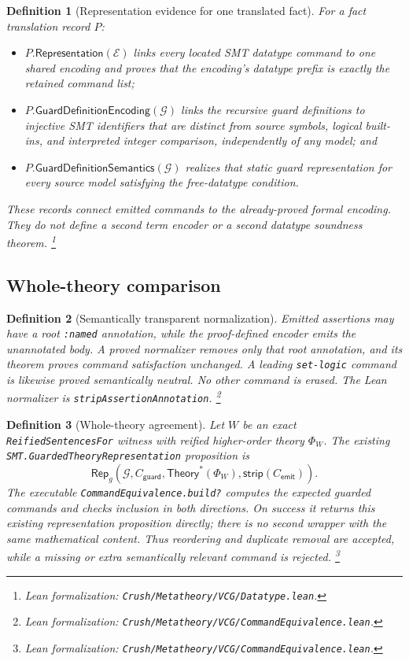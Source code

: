 \documentclass[11pt]{article}
\newtheorem{definition}{Definition}[section]
\theoremstyle{remark}
\newcommand{\leanfile}[1]{\footnote{Lean formalization: \texttt{Crush/Metatheory/#1}.}}
\newcommand{\Theorys}[1]{\mathsf{Theory}^{\!*}(#1)}
\newcommand{\Rep}{\mathsf{Rep}}
\begin{document}
\begin{definition}[Representation evidence for one translated fact]
For a fact translation record $P$:
\begin{itemize}[leftmargin=*]
 \item $P.\mathsf{Representation}(\mathcal E)$ links every located SMT datatype
       command to one shared encoding and proves that the encoding's datatype
       prefix is exactly the retained command list;
 \item $P.\mathsf{GuardDefinitionEncoding}(\mathcal G)$ links the recursive guard
       definitions to injective SMT identifiers that are distinct from source
       symbols, logical built-ins, and interpreted integer comparison,
       independently of any model; and
 \item $P.\mathsf{GuardDefinitionSemantics}(\mathcal G)$ realizes that static guard
       representation for every source model satisfying the free-datatype condition.
\end{itemize}
These records connect emitted commands to the already-proved formal
encoding. They do not define a second term encoder or a second datatype
soundness theorem.
\leanfile{VCG/Datatype.lean}
\end{definition}

\subsection{Whole-theory comparison}

\begin{definition}[Semantically transparent normalization]
Emitted assertions may have a root \texttt{:named} annotation, while the
proof-defined encoder emits the unannotated body. A proved normalizer removes only
that root annotation, and its theorem proves command satisfaction unchanged.
A leading \texttt{set-logic} command is likewise proved semantically neutral.
No other command is erased. The Lean normalizer is
\texttt{stripAssertionAnnotation}.
\leanfile{VCG/CommandEquivalence.lean}
\end{definition}

\begin{definition}[Whole-theory agreement]
Let $W$ be an exact \texttt{ReifiedSentencesFor} witness with reified
higher-order theory $\Phi_W$. The existing
\texttt{SMT.GuardedTheoryRepresentation} proposition is
\[
 \Rep_g(\mathcal G,C_{\mathsf{guard}},\Theorys{\Phi_W},
   \mathsf{strip}(C_{\mathsf{emit}})).
\]
The executable \texttt{CommandEquivalence.build?} computes the expected
guarded commands and checks inclusion in both directions. On success it returns
this existing representation proposition directly; there is no second wrapper
with the same mathematical content. Thus reordering and duplicate removal are
accepted, while a missing or extra semantically relevant command is rejected.
\leanfile{VCG/CommandEquivalence.lean}
\end{definition}
\end{document}
